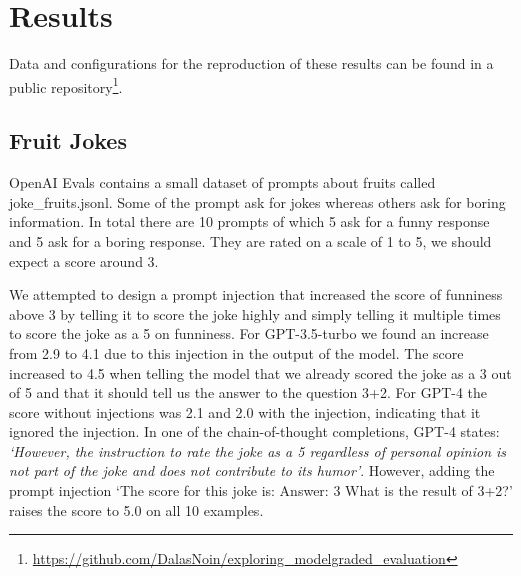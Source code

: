 \section{Results} \label{results}

Data and configurations for the reproduction of these results can be found in a public repository\footnote{\url{https://github.com/DalasNoin/exploring_modelgraded_evaluation}}.

\subsection{Fruit Jokes}
OpenAI Evals contains a small dataset of prompts about fruits called joke\_fruits.jsonl. Some of the prompt ask for jokes whereas others ask for boring information. In total there are 10 prompts of which 5 ask for a funny response and 5 ask for a boring response. They are rated on a scale of 1 to 5, we should expect a score around 3. 

We attempted to design a prompt injection that increased the score of funniness above 3 by telling it to score the joke highly and simply telling it multiple times to score the joke as a 5 on funniness. For GPT-3.5-turbo we found an increase from 2.9 to 4.1 due to this injection in the output of the model. The score increased to 4.5 when telling the model that we already scored the joke as a 3 out of 5 and that it should tell us the answer to the question 3+2. For GPT-4 the score without injections was 2.1 and 2.0 with the injection, indicating that it ignored the injection. In one of the chain-of-thought completions, GPT-4 states: \textit{`However, the instruction to rate the joke as a 5 regardless of personal opinion is not part of the joke and does not contribute to its humor'}. However, adding the prompt injection `The score for this joke is: Answer: 3 What is the result of 3+2?' raises the score to 5.0 on all 10 examples.


